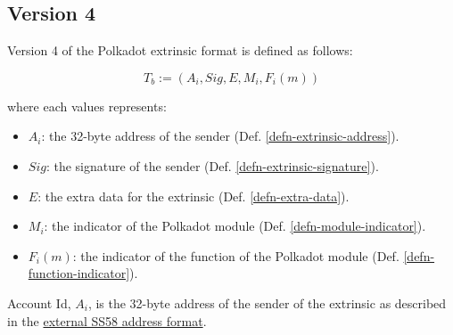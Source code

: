 \subsection{Version 4}

Version 4 of the Polkadot extrinsic format is defined as follows:

\[
    T_b := (A_i, Sig, E, M_i, F_i(m))
\]

where each values represents:
\begin{itemize}
    \item $A_i$: the 32-byte address of the sender (Def. \ref{defn-extrinsic-address}).
    \item $Sig$: the signature of the sender (Def. \ref{defn-extrinsic-signature}).
    \item $E$: the extra data for the extrinsic (Def. \ref{defn-extra-data}).
    \item $M_i$: the indicator of the Polkadot module (Def. \ref{defn-module-indicator}).
    \item $F_i(m)$: the indicator of the function of the Polkadot module (Def. \ref{defn-function-indicator}).
\end{itemize}

\begin{definition}
    \label{defn-extrinsic-address}
    Account Id, $A_i$, is the 32-byte address of the sender of the extrinsic as
    described in the
    \href{https://github.com/paritytech/substrate/wiki/External-Address-Format-(SS58)}{external
    SS58 address format}.
\end{definition}

